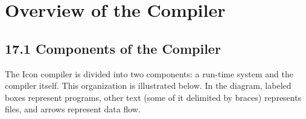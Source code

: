 \chapter{Overview of the Compiler}

\section[17.1 Components of the Compiler]{17.1 Components of the Compiler}

The Icon compiler is divided into two components: a run-time system
and the compiler itself. This organization is illustrated below. In
the diagram, labeled boxes represent programs, other text (some of it
delimited by braces) represents files, and arrows represent data flow.


